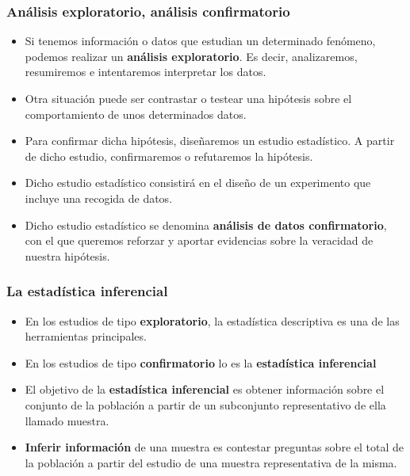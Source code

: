 \begin{frame}
\frametitle{Análisis exploratorio, análisis confirmatorio}


\begin{itemize}
 \item Si tenemos información o datos que estudian un determinado fenómeno, podemos realizar un \textbf{análisis exploratorio}. Es decir, 
analizaremos, resumiremos e intentaremos interpretar los datos.
\item Otra situación puede ser contrastar o testear una hipótesis sobre el comportamiento de unos determinados datos.
\item Para confirmar dicha hipótesis, diseñaremos un estudio estadístico. A partir de dicho estudio, confirmaremos o refutaremos la hipótesis.
\item Dicho estudio estadístico consistirá en el diseño de un experimento que incluye una recogida de datos.
\item Dicho estudio estadístico se denomina \textbf{análisis de datos confirmatorio}, con el que queremos reforzar y aportar evidencias sobre 
la veracidad de nuestra hipótesis.
\end{itemize}
\end{frame}


\begin{frame}
\frametitle{La estadística inferencial}
\begin{itemize}
\item En los estudios de tipo \textbf{exploratorio}, la estadística descriptiva es  una de las herramientas principales.
\item  En los estudios de tipo \textbf{confirmatorio} lo es la \textbf{estadística inferencial}
\item  El objetivo de la \textbf{estadística inferencial} es obtener
  información sobre el conjunto de la población a partir de un
  subconjunto representativo de ella llamado muestra.
\item \textbf{Inferir información} de una muestra es contestar
  preguntas sobre el total de la población a partir del estudio de una muestra
  representativa de la misma.
\end{itemize}
\end{frame}

